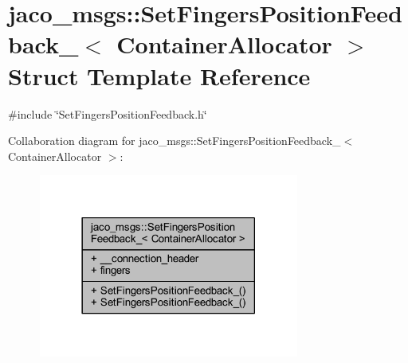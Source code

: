 \hypertarget{structjaco__msgs_1_1SetFingersPositionFeedback__}{}\section{jaco\+\_\+msgs\+:\+:Set\+Fingers\+Position\+Feedback\+\_\+$<$ Container\+Allocator $>$ Struct Template Reference}
\label{structjaco__msgs_1_1SetFingersPositionFeedback__}


{\ttfamily \#include \char`\"{}Set\+Fingers\+Position\+Feedback.\+h\char`\"{}}



Collaboration diagram for jaco\+\_\+msgs\+:\+:Set\+Fingers\+Position\+Feedback\+\_\+$<$ Container\+Allocator $>$\+:
\nopagebreak
\begin{figure}[H]
\begin{center}
\leavevmode
\includegraphics[width=242pt]{dd/d8c/structjaco__msgs_1_1SetFingersPositionFeedback____coll__graph}
\end{center}
\end{figure}
